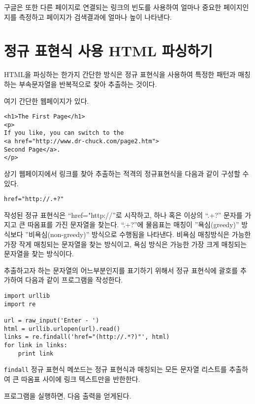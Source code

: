 구글은 또한 다른 페이지로 연결되는 링크의 빈도를 사용하여 얼마나 중요한 페이지인지를 측정하고 
페이지가 검색결과에 얼마나 높이 나타낸다.

\section{정규 표현식 사용 HTML 파싱하기}

HTML을 파싱하는 한가지 간단한 방식은 정규 표현식을 사용하여 특정한 패턴과 매칭하는 부속문자열을 반복적으로 찾아 추출하는 것이다.

여기 간단한 웹페이지가 있다.

\beforeverb
\begin{verbatim}
<h1>The First Page</h1>
<p>
If you like, you can switch to the
<a href="http://www.dr-chuck.com/page2.htm">
Second Page</a>.
</p>
\end{verbatim}
\afterverb
%

상기 웹페이지에서 링크를 찾아 추출하는 적격의 정규표현식을 다음과 같이 구성할 수 있다.

\beforeverb
\begin{verbatim}
href="http://.+?"
\end{verbatim}
\afterverb
%

작성된 정규 표현식은 ``href="http://''로 시작하고, 하나 혹은 이상의 ``.+?'' 문자를 가지고 큰 따옴표를 가진 문자열을 찾는다.
``.+?''에 물음표는 매칭이 ''욕심(greedy)'' 방식보다 ''비욕심(non-greedy)'' 방식으로 수행됨을 나타낸다. 
비욕심 매칭방식은 가능한 가장 작게 매칭되는 문자열을 찾는 방식이고, 욕심 방식은 가능한 가장 크게 매칭되는 문자열을 찾는 방식이다.


추출하고자 하는 문자열의 어느부분인지를 표기하기 위해서 정규 표현식에 괄호를 추가하여 다음과 같이 프로그램을 작성한다.


\beforeverb
\begin{verbatim}
import urllib
import re

url = raw_input('Enter - ')
html = urllib.urlopen(url).read()
links = re.findall('href="(http://.*?)"', html)
for link in links:
    print link
\end{verbatim}
\afterverb
%

{\tt findall} 정규 표현식 메쏘드는 정규 표현식과 매칭되는 모든 문자열 리스트를 추출하여 큰 따옴표 사이에 링크 텍스트만을 반한한다.

프로그램을 실행하면, 다음 출력을 얻게된다.

